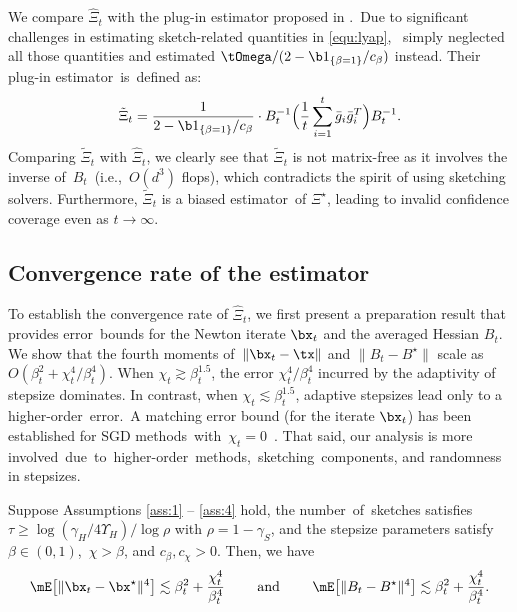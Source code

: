 \begin{remark}\label{rem:1}
We compare $\hat{\Xi}_t$ with the plug-in estimator proposed in \cite{Na2022Statistical}.~Due to significant challenges in estimating sketch-related quantities in \eqref{equ:lyap}, \cite{Na2022Statistical}~simply neglected all those quantities and estimated $\tOmega/(2-\b1_{\{\beta=1\}}/c_\beta)$ instead. Their plug-in \mbox{estimator}~is~defined as:
\begin{equation}\label{exp:PI}
\tilde{\Xi}_t = \frac{1}{2 - \b1_{\{\beta=1\}}/c_\beta} \cdot B_t^{-1}\Big(\frac{1}{t}\sum_{i=1}^t\bar{g}_i\bar{g}_i^T\Big)B_t^{-1}.
\end{equation}
Comparing $\tilde{\Xi}_t$ with $\hat{\Xi}_t$, we clearly see that $\tilde{\Xi}_t$ is not matrix-free as it involves the inverse of~$B_t$~(i.e.,~$O(d^3)$ flops), which contradicts the spirit of using sketching solvers. Furthermore, $\tilde{\Xi}_t$ is a biased estimator~of $\Xi^\star$, leading to invalid confidence coverage even as $t\rightarrow\infty$.
\end{remark}



\subsection{Convergence rate of the estimator }\label{sec4:subsec1}

To establish the convergence rate of $\hat{\Xi}_t$, we first present a preparation result that provides \mbox{error}~bounds for the Newton iterate $\bx_t$ and the averaged Hessian $B_t$. We show that the fourth moments of~$\|\bx_t-\tx\|$ and $\|B_t- B^\star\|$ scale as $O(\beta_t^2+\chi_t^4/\beta_t^4)$. 
When $\chi_t \gtrsim \beta_t^{1.5}$, the error $\chi_t^4/\beta_t^4$ incurred by the adaptivity of stepsize dominates. In contrast, when $\chi_t\lesssim \beta_t^{1.5}$, adaptive stepsizes lead only to a higher-order~error.~A matching error bound (for the iterate $\bx_t$) has been established for SGD methods~with~$\chi_t=0$~\citep{Chen2020Statistical}. That said, our analysis is more involved~due~to~\mbox{higher-order}~methods,~sketching~components, and randomness in stepsizes. 


\begin{lemma}\label{sec4:lem1}

Suppose Assumptions \ref{ass:1} -- \ref{ass:4} hold, the \mbox{number}~of~sketches satisfies $\tau\geq \log(\gamma_H/4\Upsilon_H)/\log \rho$ with $\rho = 1-\gamma_S$, and the stepsize parameters satisfy $\beta\in(0,1)$,~$\chi>\beta$, and $c_{\beta}, c_{\chi}>0$. Then, we have
\begin{equation*}
\mE\big[\|\bx_t-\bx^\star\|^4\big]\lesssim \beta_t^2 + \frac{\chi_t^4}{\beta_t^4}\quad\quad\text{ and }\quad\quad \mE\big[\|B_t-B^\star\|^4\big]\lesssim \beta_t^2 + \frac{\chi_t^4}{\beta_t^4}.
\end{equation*}

\end{lemma}


